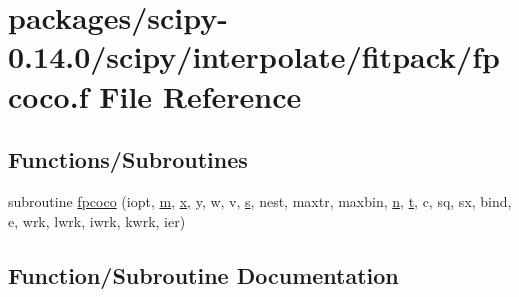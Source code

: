 \hypertarget{fpcoco_8f}{}\section{packages/scipy-\/0.14.0/scipy/interpolate/fitpack/fpcoco.f File Reference}
\label{fpcoco_8f}
\subsection*{Functions/\+Subroutines}
\begin{DoxyCompactItemize}
\item 
subroutine \hyperlink{fpcoco_8f_ac8f06b445858f9d9032d9f910e3ba862}{fpcoco} (iopt, \hyperlink{indexexpr_8h_ab72fdb4031d47b75ab26dd18a437bcdc}{m}, \hyperlink{vecnorm1_8cc_ac73eed9e41ec09d58f112f06c2d6cb63}{x}, y, w, v, \hyperlink{indexexpr_8h_ae024b0db549122b44c349ae28ec990dc}{s}, nest, maxtr, maxbin, \hyperlink{indexexpr_8h_ab427e2e2b4d6cec55fa088ea2a692ace}{n}, \hyperlink{indexexpr_8h_a01709998b82be3f34e0412206618d09d}{t}, c, sq, sx, bind, e, wrk, lwrk, iwrk, kwrk, ier)
\end{DoxyCompactItemize}


\subsection{Function/\+Subroutine Documentation}
\hypertarget{fpcoco_8f_ac8f06b445858f9d9032d9f910e3ba862}{}
